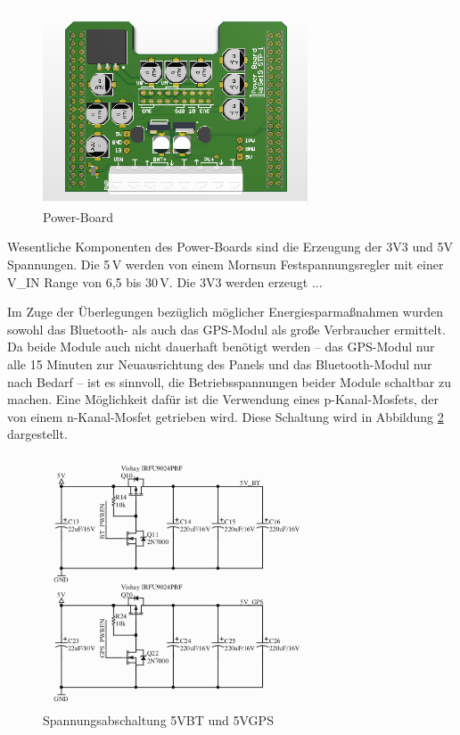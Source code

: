 \begin{figure}[H]
  \centering
  \includegraphics[width=0.7\textwidth]{./img/PCB_Power_3D_top.png}
  \caption{Power-Board}\label{fig.powerboard}
\end{figure}

Wesentliche Komponenten des Power-Boards sind die Erzeugung der 3V3 und 5V Spannungen. Die 5\,V werden von einem Mornsun Festspannungsregler mit einer V\_IN Range von 6,5 bis 30\,V.
Die 3V3 werden erzeugt ...%

Im Zuge der Überlegungen bezüglich möglicher Energiesparmaßnahmen wurden sowohl das Bluetooth- als auch das GPS-Modul als große Verbraucher ermittelt. Da beide Module auch nicht dauerhaft benötigt werden -- das GPS-Modul nur alle 15 Minuten zur Neuausrichtung des Panels und das Bluetooth-Modul nur nach Bedarf -- ist es sinnvoll, die Betriebsspannungen beider Module schaltbar zu machen. Eine Möglichkeit dafür ist die Verwendung eines p-Kanal-Mosfets, der von einem n-Kanal-Mosfet getrieben wird. Diese Schaltung wird in Abbildung \ref{fig.spannungsabschaltung} dargestellt.

\begin{figure}[H]
  \centering
  \includegraphics[width=0.7\textwidth]{./img/spannungsabschaltung.png}
  \caption{Spannungsabschaltung 5VBT und 5VGPS}\label{fig.spannungsabschaltung}
\end{figure}

